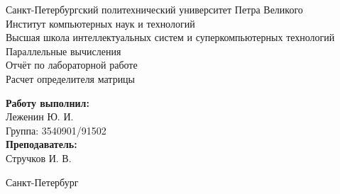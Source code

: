\documentclass[a4paper,14pt]{extarticle}
\begin{document}
    \begin{titlepage} %

    \begin{center}  %

        \normalsize Санкт-Петербургский политехнический университет Петра Великого\\
        \normalsize Институт компьютерных наук и технологий \\
        \normalsize Высшая школа интеллектуальных систем и суперкомпьютерных технологий\\[5cm]

        \huge Параллельные вычисления\\[0.5cm] %
        \large Отчёт по лабораторной работе\\[0.1cm]
        \large Расчет определителя матрицы \\[4cm]

    \end{center}


    \begin{flushright} %
        \begin{minipage}{0.25\textwidth} %
            \begin{flushleft} %

                \large\textbf{Работу выполнил:}\\
                \large Леженин Ю. И.\\
                \large {Группа:} 3540901/91502\\

                \large \textbf{Преподаватель:}\\
                \large Стручков И. В.

            \end{flushleft}
        \end{minipage}
    \end{flushright}

    \vfill %

    \begin{center}
        \large Санкт-Петербург\\
        \large \the\year %
    \end{center} %

    \end{titlepage} %
\end{document}

